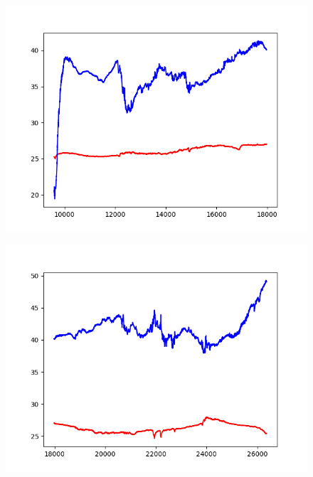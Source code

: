\documentclass[11pt]{article}
\begin{document}
\begin{figure}
\includegraphics[width=\textwidth]{log-201758}
\end{figure}

\begin{figure}
\includegraphics[width=\textwidth]{log-201759}
\end{figure}
\end{document}
